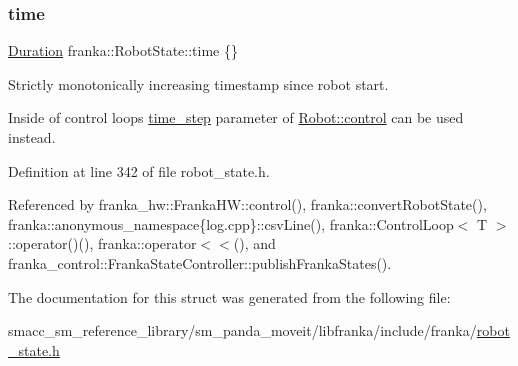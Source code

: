 \subsubsection{\texorpdfstring{time}{time}}
{\footnotesize\ttfamily \hyperlink{classfranka_1_1Duration}{Duration} franka\+::\+Robot\+State\+::time \{\}}

Strictly monotonically increasing timestamp since robot start.

Inside of control loops \hyperlink{classfranka_1_1Robot_callback-docs}{time\+\_\+step} parameter of \hyperlink{classfranka_1_1Robot_a5b5ba0a4f2bfd20be963b05622e629e1}{Robot\+::control} can be used instead. 

Definition at line 342 of file robot\+\_\+state.\+h.



Referenced by franka\+\_\+hw\+::\+Franka\+H\+W\+::control(), franka\+::convert\+Robot\+State(), franka\+::anonymous\+\_\+namespace\{log.\+cpp\}\+::csv\+Line(), franka\+::\+Control\+Loop$<$ T $>$\+::operator()(), franka\+::operator$<$$<$(), and franka\+\_\+control\+::\+Franka\+State\+Controller\+::publish\+Franka\+States().



The documentation for this struct was generated from the following file\+:\begin{DoxyCompactItemize}
\item 
smacc\+\_\+sm\+\_\+reference\+\_\+library/sm\+\_\+panda\+\_\+moveit/libfranka/include/franka/\hyperlink{robot__state_8h}{robot\+\_\+state.\+h}\end{DoxyCompactItemize}
